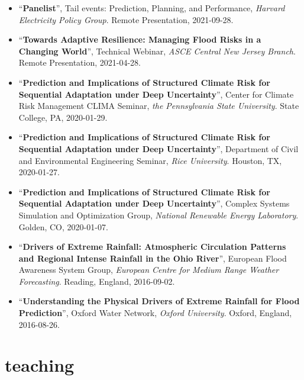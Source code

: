 \documentclass[10pt,oneside]{article}
\begin{document}
\begin{itemize}[label={}]
  \item \enquote{\textbf{Panelist}}, Tail events: Prediction, Planning, and Performance,  \textit{Harvard Electricity Policy Group}. Remote Presentation, 2021-09-28.
  
  \item \enquote{\textbf{Towards Adaptive Resilience: Managing Flood Risks in a Changing World}}, Technical Webinar,  \textit{ASCE Central New Jersey Branch}. Remote Presentation, 2021-04-28.
  
  \item \enquote{\textbf{Prediction and Implications of Structured Climate Risk for Sequential Adaptation under Deep Uncertainty}}, Center for Climate Risk Management CLIMA Seminar,  \textit{the Pennsylvania State University}. State College, PA, 2020-01-29.
  
  \item \enquote{\textbf{Prediction and Implications of Structured Climate Risk for Sequential Adaptation under Deep Uncertainty}}, Department of Civil and Environmental Engineering Seminar,  \textit{Rice University}. Houston, TX, 2020-01-27.
  
  \item \enquote{\textbf{Prediction and Implications of Structured Climate Risk for Sequential Adaptation under Deep Uncertainty}}, Complex Systems Simulation and Optimization Group,  \textit{National Renewable Energy Laboratory}. Golden, CO, 2020-01-07.
  
  \item \enquote{\textbf{Drivers of Extreme Rainfall: Atmospheric Circulation Patterns and Regional Intense Rainfall in the Ohio River}}, European Flood Awareness System Group,  \textit{European Centre for Medium Range Weather Forecasting}. Reading, England, 2016-09-02.
  
  \item \enquote{\textbf{Understanding the Physical Drivers of Extreme Rainfall for Flood Prediction}}, Oxford Water Network,  \textit{Oxford University}. Oxford, England, 2016-08-26.
  
\end{itemize}


\section{teaching}

\mbox{}\vspace{-\dimexpr\baselineskip\relax}
\end{document}
